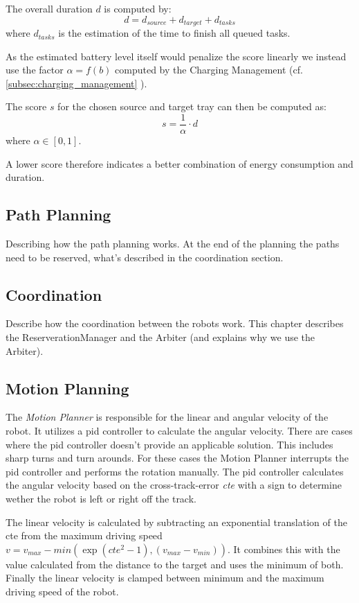 \documentclass[journal]{IEEEtran}
\newcommand{\compref}[1]{\autoref{#1} \nameref{#1}}
\begin{document}
The overall duration $d$ is computed by:
$$d = d_{source} + d_{target} + d_{tasks}$$
where $d_{tasks}$ is the estimation of the time to finish all queued tasks.

As the estimated battery level itself would penalize the score linearly we instead use the factor $\alpha = f(b)$ computed by the Charging Management (cf. \compref{subsec:charging_management}).

The score $s$ for the chosen source and target tray can then be computed as:
$$ s = \frac{1}{\alpha} \cdot d$$
where $\alpha \in [0, 1]$.

A lower score therefore indicates a better combination of energy consumption and duration.


\subsection{Path Planning}
\label{subsec:path_planning}
Describing how the path planning works. At the end of the planning the paths need to be reserved, what's described in the coordination section.

\subsection{Coordination}
\label{subsec:coordination}
Describe how the coordination between the robots work. This chapter describes the ReserverationManager and the Arbiter (and explains why we use the Arbiter).

\subsection{Motion Planning}
\label{subsec:motion_planning}
The \emph{Motion Planner} is responsible for the linear and angular velocity of the robot. It utilizes a pid controller to calculate the angular velocity. There are cases where the pid controller doesn't provide an applicable solution. This includes sharp turns and turn arounds. For these cases the Motion Planner interrupts the pid controller and performs the rotation manually. The pid controller calculates the angular velocity based on the cross-track-error \emph{cte} with a sign to determine wether the robot is left or right off the track.

The linear velocity is calculated by subtracting an exponential translation of the cte from the maximum driving speed $v = v_{max} - min(\exp(cte^2-1), (v_{max}-v_{min}))$. It combines this with the value calculated from the distance to the target and uses the minimum of both. Finally the linear velocity is clamped between minimum and the maximum driving speed of the robot.
\end{document}
